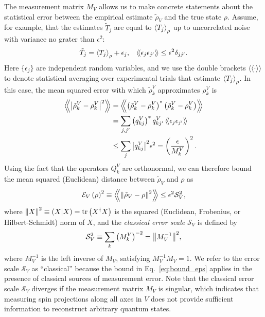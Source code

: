 \documentclass[nofootinbib,twocolumn]{revtex4-1}
\newcommand{\f}[2]{\dfrac{#1}{#2}} %
\newcommand{\p}[1]{\left(#1\right)} %
\newcommand{\bk}{\Braket} %
\renewcommand{\set}[1]{\{#1\}} %
\newcommand{\bbk}[1]{\langle\!\langle #1 \rangle\!\rangle}
\newcommand{\Bbk}[1]
{\left\langle\!\!\left\langle #1 \right\rangle\!\!\right\rangle}
\newcommand{\E}{\mathcal{E}}
\renewcommand{\S}{\mathcal{S}}
\def\obk#1{\mathinner{({#1})}}
\begin{document}
The measurement matrix $M_V$ allows us to make concrete statements about the statistical error between the empirical estimate $\tilde\rho_V$ and the true state $\rho$.
Assume, for example, that the estimates $\tilde T_j$ are equal to $\bk{T_j}_\rho$ up to uncorrelated noise with variance no grater than $\epsilon^2$:
\begin{align}
  \tilde T_j = \bk{T_j}_\rho + \epsilon_j,
  &&
  \bbk{\epsilon_j \epsilon_{j'}} \le \epsilon^2 \delta_{jj'}.
  \label{eq:error_assumption}
\end{align}
Here $\set{\epsilon_j}$ are independent random variables, and we use the double brackets $\bbk{\cdot}$ to denote statistical averaging over experimental trials that estimate $\bk{T_j}_\rho$.
In this case, the mean squared error with which $\tilde\rho^V_k$ approximates $\rho^V_k$ is
\begin{align}
  \Bbk{\abs{\tilde\rho^V_k-\rho^V_k}^2}
  &= \Bbk{\p{\tilde\rho^V_k-\rho^V_k}^*\p{\tilde\rho^V_k-\rho^V_k}} \\
  &= \sum_{j,j'} \p{q^V_{kj}}^* q^V_{kj'} \,
  \bbk{\epsilon_j \epsilon_{j'}} \\
  &\le \sum_j \abs{q^V_{kj}}^2 \epsilon^2
  = \p{\f{\epsilon}{M^V_k}}^2.
\end{align}
Using the fact that the operators $Q^V_k$ are orthonormal, we can therefore bound the mean squared (Euclidean) distance between $\tilde\rho_V$ and $\rho$ as
\begin{align}
  \E_V\p{\rho}^2
  \equiv \Bbk{\norm{\tilde\rho_V-\rho}^2}
  \le \epsilon^2 \S_V^2,
  \label{eq:bound_eps}
\end{align}
where $\norm{X}^2 \equiv \obk{X|X} = \tr\p{X^\dag X}$ is the squared (Euclidean, Frobenius, or Hilbert-Schmidt) norm of $X$, and the {\it classical error scale} $\S_V$ is defined by
\begin{align}
  \S_V^2 \equiv \sum_k \p{M^V_k}^{-2} = \norm{M_V^{-1}}^2,
\end{align}
where $M_V^{-1}$ is the left inverse of $M_V$, satisfying $M_V^{-1} M_V = 1$.
We refer to the error scale $\S_V$ as ``classical'' because the bound in Eq.~\eqref{eq:bound_eps} applies in the presence of classical sources of measurement error.
Note that the classical error scale $\S_V$ diverges if the measurement matrix $M_V$ is singular, which indicates that measuring spin projections along all axes in $V$ does not provide sufficient information to reconstruct arbitrary quantum states.
\end{document}

